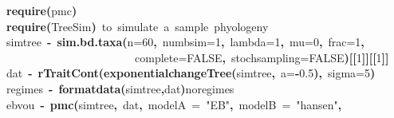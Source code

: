 \documentclass{elsarticle}
\makeatletter
\newcommand{\hlnumber}[1]{\textcolor[rgb]{0,0,0}{#1}}%
\newcommand{\hlfunctioncall}[1]{\textcolor[rgb]{.5,0,.33}{\textbf{#1}}}%
\newcommand{\hlstring}[1]{\textcolor[rgb]{.6,.6,1}{#1}}%
\newcommand{\hlkeyword}[1]{\textbf{#1}}%
\newcommand{\hlargument}[1]{\textcolor[rgb]{.69,.25,.02}{#1}}%
\newcommand{\hlcomment}[1]{\textcolor[rgb]{.18,.6,.34}{#1}}%
\newcommand{\hlassignement}[1]{\textbf{#1}}%
\newcommand{\hlsymbol}[1]{#1}%
\newcommand{\hlstd}[1]{\textcolor[rgb]{0,0,0}{#1}}%
\newenvironment{kframe}{%
 \def\FrameCommand##1{\hskip\@totalleftmargin \hskip-\fboxsep
 \colorbox{shadecolor}{##1}\hskip-\fboxsep
     \hskip-\linewidth \hskip-\@totalleftmargin \hskip\columnwidth}%
 \MakeFramed {\advance\hsize-\width
   \@totalleftmargin\z@ \linewidth\hsize
   \@setminipage}}%
 {\par\unskip\endMakeFramed}
\newenvironment{knitrout}{}{} %
\makeatother
\begin{document}
\begin{knitrout}
\color{fgcolor}\begin{kframe}
\begin{flushleft}
\ttfamily\noindent
\hlfunctioncall{require}\hlkeyword{(}\hlsymbol{pmc}\hlkeyword{)}\hspace*{\fill}\\
\hlstd{}\hlfunctioncall{require}\hlkeyword{(}\hlsymbol{TreeSim}\hlkeyword{)}{\ }\hlcomment{\usebox{\hlnormalsizeboxhash}{\ }to{\ }simulate{\ }a{\ }sample{\ }phyologeny}\hspace*{\fill}\\
\hlstd{}\hlsymbol{simtree}{\ }\hlassignement{\usebox{\hlnormalsizeboxlessthan}-}{\ }\hlfunctioncall{sim.bd.taxa}\hlkeyword{(}\hlargument{n}\hlargument{=}\hlnumber{60}\hlkeyword{,}{\ }\hlargument{numbsim}\hlargument{=}\hlnumber{1}\hlkeyword{,}{\ }\hlargument{lambda}\hlargument{=}\hlnumber{1}\hlkeyword{,}{\ }\hlargument{mu}\hlargument{=}\hlnumber{0}\hlkeyword{,}{\ }\hlargument{frac}\hlargument{=}\hlnumber{1}\hlkeyword{,}\hspace*{\fill}\\
\hlstd{}{\ }{\ }{\ }{\ }{\ }{\ }{\ }{\ }{\ }{\ }{\ }{\ }{\ }{\ }{\ }{\ }{\ }{\ }{\ }{\ }{\ }{\ }{\ }\hlargument{complete}\hlargument{=}\hlnumber{FALSE}\hlkeyword{,}{\ }\hlargument{stochsampling}\hlargument{=}\hlnumber{FALSE}\hlkeyword{)}\hlkeyword{[[}\hlnumber{1}\hlkeyword{]}\hlkeyword{]}\hlkeyword{[[}\hlnumber{1}\hlkeyword{]}\hlkeyword{]}\hspace*{\fill}\\
\hlstd{}\hlsymbol{dat}{\ }\hlassignement{\usebox{\hlnormalsizeboxlessthan}-}{\ }\hlfunctioncall{rTraitCont}\hlkeyword{(}\hlfunctioncall{exponentialchangeTree}\hlkeyword{(}\hlsymbol{simtree}\hlkeyword{,}{\ }\hlargument{a}\hlargument{=}\hlkeyword{-}\hlnumber{0.5}\hlkeyword{)}\hlkeyword{,}{\ }\hlargument{sigma}\hlargument{=}\hlnumber{5}\hlkeyword{)}\hspace*{\fill}\\
\hlstd{}\hlsymbol{regimes}{\ }\hlassignement{\usebox{\hlnormalsizeboxlessthan}-}{\ }\hlfunctioncall{format\usebox{\hlnormalsizeboxunderscore}data}\hlkeyword{(}\hlsymbol{simtree}\hlkeyword{,}\hlsymbol{dat}\hlkeyword{)}\hlkeyword{\usebox{\hlnormalsizeboxdollar}}\hlsymbol{noregimes}\hspace*{\fill}\\
\hlstd{}\hlsymbol{eb\usebox{\hlnormalsizeboxunderscore}v\usebox{\hlnormalsizeboxunderscore}ou}{\ }\hlassignement{\usebox{\hlnormalsizeboxlessthan}-}{\ }\hlfunctioncall{pmc}\hlkeyword{(}\hlsymbol{simtree}\hlkeyword{,}{\ }\hlsymbol{dat}\hlkeyword{,}{\ }\hlargument{modelA}{\ }\hlargument{=}{\ }\hlstring{"{}EB"{}}\hlkeyword{,}{\ }\hlargument{modelB}{\ }\hlargument{=}{\ }\hlstring{"{}hansen"{}}\hlkeyword{,}\hspace*{\fill}\\

\end{flushleft}
\end{kframe}
\end{knitrout}
\end{document}

